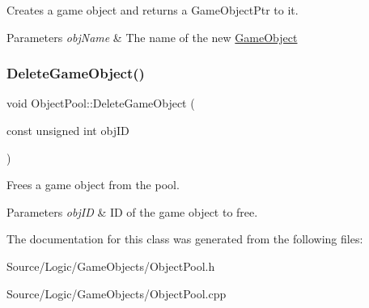 Creates a game object and returns a Game\+Object\+Ptr to it. 


\begin{DoxyParams}{Parameters}
{\em obj\+Name} & The name of the new \mbox{\hyperlink{class_game_object}{Game\+Object}} \\
\hline
\end{DoxyParams}
\mbox{\label{class_object_pool_a074b2f5730a286179cf5e0f5bd9374ce}} 
\subsubsection{\texorpdfstring{Delete\+Game\+Object()}{DeleteGameObject()}}
{\footnotesize\ttfamily void Object\+Pool\+::\+Delete\+Game\+Object (\begin{DoxyParamCaption}\item[{const unsigned int}]{obj\+ID }\end{DoxyParamCaption})}



Frees a game object from the pool. 


\begin{DoxyParams}{Parameters}
{\em obj\+ID} & ID of the game object to free. \\
\hline
\end{DoxyParams}


The documentation for this class was generated from the following files\+:\begin{DoxyCompactItemize}
\item 
Source/\+Logic/\+Game\+Objects/Object\+Pool.\+h\item 
Source/\+Logic/\+Game\+Objects/Object\+Pool.\+cpp\end{DoxyCompactItemize}
